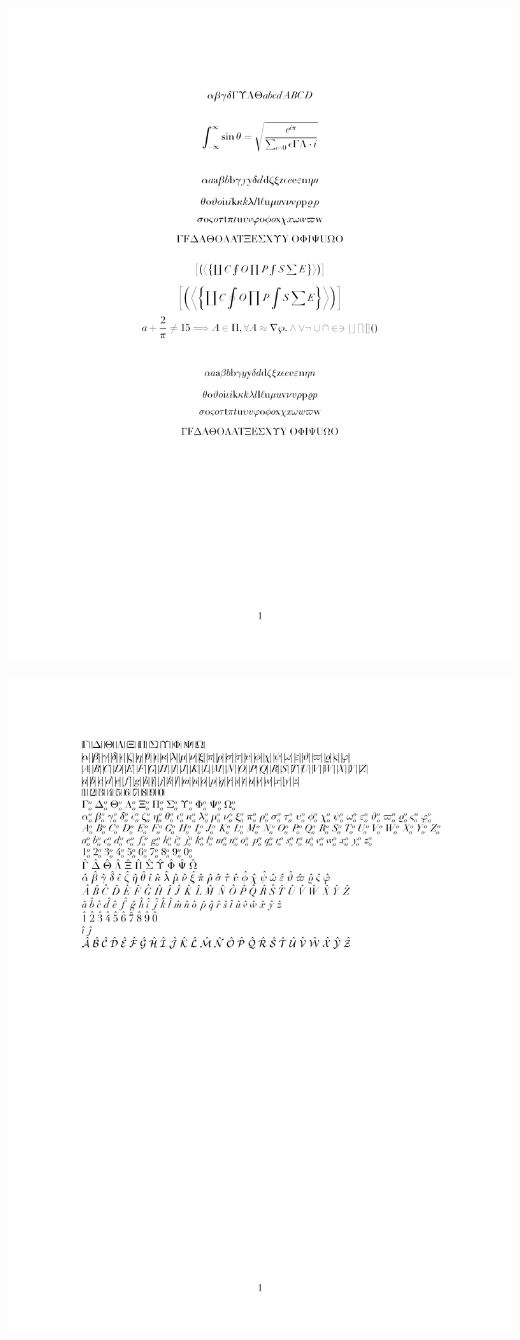 \documentclass[twocolumn]{article}
\begin{document}
 \noindent\includegraphics*{../results/didot-font}\par
{} \noindent\includegraphics*{../results/didot-pos}\par
\end{document}
